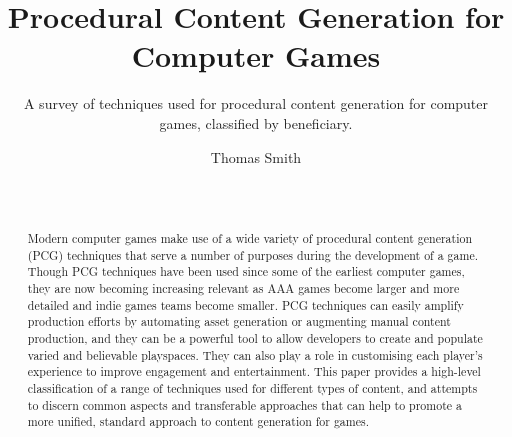 \documentclass{./acm_proc_article-sp}
\begin{document}
\title{Procedural Content Generation for Computer Games}
\subtitle{A survey of techniques used for procedural content generation for computer games, classified by beneficiary.}

\author{
\alignauthor
Thomas Smith\\
       \\
       \\
}

\maketitle
\begin{abstract}
Modern computer games make use of a wide variety of procedural content generation (PCG) techniques that serve a number of purposes during the development of a game. Though PCG techniques have been used since some of the earliest computer games\cite{elite}, they are now becoming increasing relevant as AAA games become larger and more detailed and indie games teams become smaller. PCG techniques can easily amplify production efforts by automating asset generation or augmenting manual content production, and they can be a powerful tool to allow developers to create and populate varied and believable playspaces. They can also play a role in customising each player's experience to improve engagement and entertainment. This paper provides a high-level classification of a range of techniques used for different types of content, and attempts to discern common aspects and transferable approaches that can help to promote a more unified, standard approach to content generation for games. 






\end{abstract}
\end{document}
